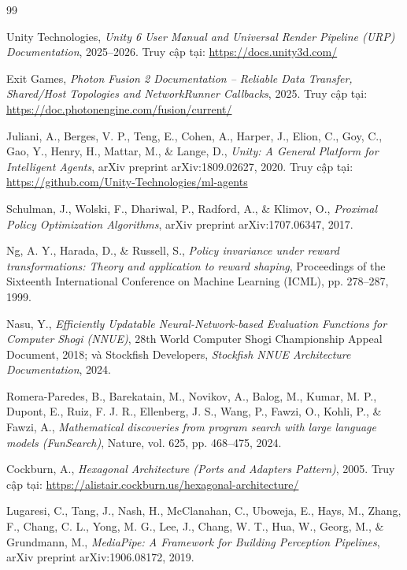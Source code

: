 \begin{thebibliography}{99}

Unity Technologies, \textit{Unity 6 User Manual and Universal Render Pipeline (URP) Documentation}, 2025--2026. Truy cập tại: \url{https://docs.unity3d.com/}

Exit Games, \textit{Photon Fusion 2 Documentation -- Reliable Data Transfer, Shared/Host Topologies and NetworkRunner Callbacks}, 2025. Truy cập tại: \url{https://doc.photonengine.com/fusion/current/}

Juliani, A., Berges, V. P., Teng, E., Cohen, A., Harper, J., Elion, C., Goy, C., Gao, Y., Henry, H., Mattar, M., \& Lange, D., \textit{Unity: A General Platform for Intelligent Agents}, arXiv preprint arXiv:1809.02627, 2020. Truy cập tại: \url{https://github.com/Unity-Technologies/ml-agents}

Schulman, J., Wolski, F., Dhariwal, P., Radford, A., \& Klimov, O., \textit{Proximal Policy Optimization Algorithms}, arXiv preprint arXiv:1707.06347, 2017.

Ng, A. Y., Harada, D., \& Russell, S., \textit{Policy invariance under reward transformations: Theory and application to reward shaping}, Proceedings of the Sixteenth International Conference on Machine Learning (ICML), pp. 278--287, 1999.

Nasu, Y., \textit{Efficiently Updatable Neural-Network-based Evaluation Functions for Computer Shogi (NNUE)}, 28th World Computer Shogi Championship Appeal Document, 2018; và Stockfish Developers, \textit{Stockfish NNUE Architecture Documentation}, 2024.

Romera-Paredes, B., Barekatain, M., Novikov, A., Balog, M., Kumar, M. P., Dupont, E., Ruiz, F. J. R., Ellenberg, J. S., Wang, P., Fawzi, O., Kohli, P., \& Fawzi, A., \textit{Mathematical discoveries from program search with large language models (FunSearch)}, Nature, vol. 625, pp. 468--475, 2024.

Cockburn, A., \textit{Hexagonal Architecture (Ports and Adapters Pattern)}, 2005. Truy cập tại: \url{https://alistair.cockburn.us/hexagonal-architecture/}

Lugaresi, C., Tang, J., Nash, H., McClanahan, C., Uboweja, E., Hays, M., Zhang, F., Chang, C. L., Yong, M. G., Lee, J., Chang, W. T., Hua, W., Georg, M., \& Grundmann, M., \textit{MediaPipe: A Framework for Building Perception Pipelines}, arXiv preprint arXiv:1906.08172, 2019.


\end{thebibliography}
